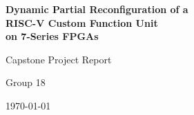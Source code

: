 \documentclass[12pt,a4paper]{report}
\begin{document}
\begin{titlepage}
  \centering
  \vspace*{3cm}
  {\LARGE\bfseries Dynamic Partial Reconfiguration of a\\[0.4em]
   RISC-V Custom Function Unit\\[0.4em]
   on 7-Series FPGAs\par}
  \vspace{2cm}
  {\large Capstone Project Report\par}
  \vspace{1.5cm}
  {\large Group 18\par}
  \vfill
  {\large \today\par}
\end{titlepage}

\tableofcontents
\clearpage








\end{document}

